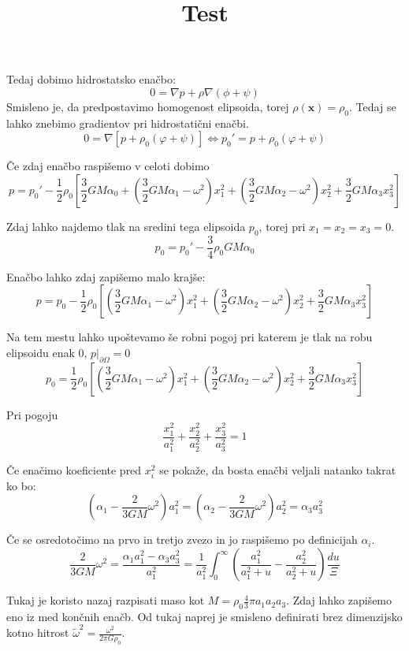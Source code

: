 \documentclass{article}
\theoremstyle{definition}
\theoremstyle{plain}
\numberwithin{definition}{section}
\numberwithin{theorem}{section} \title{Test}
\begin{document}
Tedaj dobimo hidrostatsko enačbo:
\begin{equation}
	0 = \nabla p + \rho \nabla (\phi + \psi)
	\label{eq: hidrostatska}
\end{equation}
Smisleno je, da predpostavimo homogenost elipsoida, 
torej $\rho(\boldsymbol{x}) = \rho_0$. Tedaj se lahko znebimo gradientov
pri hidrostatični enačbi.
$$0 = \nabla \left[ p + \rho_0 (\varphi + \psi) \right] \iff 
p_{0}' = p + \rho_0 (\varphi + \psi)$$

Če zdaj enačbo raspišemo v celoti dobimo
$$p = p_{0}' - \frac{1}{2} \rho_0 \left[ \frac{3}{2} G M \alpha_0 +
(\frac{3}{2} G M \alpha_1 - \omega^2) x_1^2 +
(\frac{3}{2} G M \alpha_2 - \omega^2) x_2^2 +
\frac{3}{2} G M \alpha_3 x_3^2 
\right]$$

Zdaj lahko najdemo tlak na sredini tega elipsoida $p_0$, torej pri 
$x_1 = x_2 = x_3 = 0$.
$$p_0 = p_0' - \frac{3}{4} \rho_0 G M \alpha_0$$

Enačbo lahko zdaj zapišemo malo krajše:
$$p = p_{0} - \frac{1}{2} \rho_0 \left[
(\frac{3}{2} G M \alpha_1 - \omega^2) x_1^2 +
(\frac{3}{2} G M \alpha_2 - \omega^2) x_2^2 +
\frac{3}{2} G M \alpha_3 x_3^2 
\right]$$

Na tem mestu lahko upoštevamo še robni pogoj pri katerem je tlak na robu
elipsoidu enak 0, $p|_{\partial \Omega} = 0$
$$p_{0} = \frac{1}{2} \rho_0 \left[
(\frac{3}{2} G M \alpha_1 - \omega^2) x_1^2 +
(\frac{3}{2} G M \alpha_2 - \omega^2) x_2^2 +
\frac{3}{2} G M \alpha_3 x_3^2 
\right]$$

Pri pogoju
$$\frac{x_1^2}{a_1^2} + \frac{x_2^2}{a_2^2} + \frac{x_3^2}{a_3^2} = 1$$

Če enačimo koeficiente pred $x_i^2$
se pokaže, da bosta enačbi veljali natanko takrat ko bo:
\begin{equation}
	\left(\alpha_1 - \frac{2}{3GM}\omega^2\right)a_1^2 = 
	\left(\alpha_2 - \frac{2}{3GM}\omega^2\right)a_2^2 = 
	\alpha_3 a_3^2 
	\label{eq: main_zveza}
\end{equation}


Če se osredotočimo na prvo in tretjo zvezo in jo raspišemo po definicijah $\alpha_i$.
\begin{equation}
	\frac{2}{3GM}\omega^2 = \frac{\alpha_1 a_1^2 - \alpha_3 a_3^2}{a_1^2} = 
	\frac{1}{a_1^2} \int_0^{\infty}  
	\left( \frac{a_1^2}{a_1^2 + u} - \frac{a_2^2}{a_2^2 + u} \right) \frac{du}{\Xi}
	\label{eq:vmesni_korak}
\end{equation}

Tukaj je koristo nazaj razpisati maso kot 
$M = \rho_{0} \frac{4}{3} \pi a_1 a_2 a_3$. 
Zdaj lahko zapišemo eno iz med končnih enačb. Od tukaj naprej je smisleno
definirati brez dimenzijsko kotno hitrost 
$\tilde{\omega}^2 = \frac{\omega^2}{2 \pi G \rho_0}$.
\end{document}
